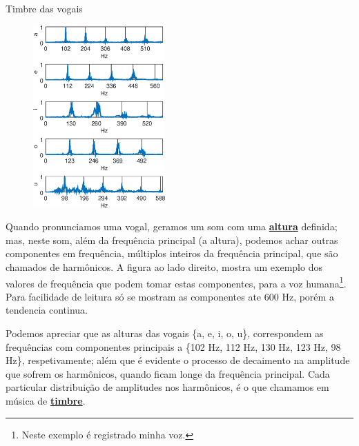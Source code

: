 \begin{elaboracion}{Timbre das vogais}

\begin{figure}
\begin{center}
\includegraphics[width=0.45\textwidth]{chapters/cap-musica-basica/vocales-fourier.eps}
\end{center}
\end{figure}
Quando pronunciamos uma  vogal, geramos um som com uma \hyperref[sec:pos:Altura]{\textbf{altura}} definida;
mas, neste som, além da  frequência principal (a altura), podemos achar outras componentes em frequência,
múltiplos inteiros da  frequência principal, que são chamados de harmônicos.
A figura ao lado direito, mostra um exemplo dos valores de frequência 
que podem tomar estas componentes, para a voz humana\footnote{Neste exemplo é registrado minha voz.}.
Para facilidade de leitura só se mostram as componentes ate 600 Hz, 
porém a tendencia continua. 

Podemos apreciar que as alturas  das vogais \{a, e, i, o, u\}, 
correspondem as frequências com componentes principais a \{102 Hz, 112 Hz, 130 Hz, 123 Hz, 98 Hz\}, respetivamente;
além que é evidente o processo de decaimento na amplitude que sofrem os harmônicos,
quando ficam longe da frequência principal.
Cada particular distribuição de amplitudes nos harmônicos, 
é o que chamamos em música de \hyperref[sec:pos:timbre]{\textbf{timbre}}.


\end{elaboracion}
